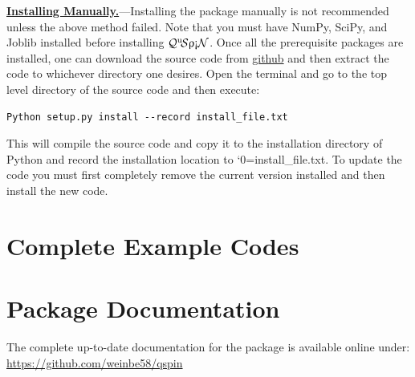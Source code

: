 \documentclass{SciPost}
\newcommand\0{\scalebox{-1}[1]{0}}
\let\svttfamily\ttfamily
\renewcommand\ttfamily{\svttfamily\catcode`0=\active }
\renewcommand\texttt{\bgroup\ttfamily\texttthelp}
\def\texttthelp#1{#1\egroup}
\newcommand{\qspin}{$\mathcal{Q}^{\mathrm{u}}\!\mathcal{S}\uprho\mathrm{\text{\textexclamdown}}\mathcal{N}$}
\begin{document}
\begin{appendix}
\underline{\bf Installing Manually.}---Installing the package manually is not recommended unless the above method failed. Note that you must have NumPy, SciPy, and Joblib installed before installing \qspin. Once all the prerequisite packages are installed, one can download the source code from \href{https://github.com/weinbe58/qspin/tree/master}{github} and then extract the code to whichever directory one desires. Open the terminal and go to the top level directory of the source code and then execute:  
\begin{lstlisting}[numbers=none]
Python setup.py install --record install_file.txt
\end{lstlisting}
This will compile the source code and copy it to the installation directory of Python and record the installation location to \texttt{install\_file.txt}. To update the code you must first completely remove the current version installed and then install the new code. 


\newpage
\section{Complete Example Codes}
\label{app:scripts}

\newpage

\newpage



\section{Package Documentation}
\label{app:doc}
The complete up-to-date documentation for the package is available online under:\\

\href{https://github.com/weinbe58/qspin}{https://github.com/weinbe58/qspin}\\

\end{appendix}


%
%

\nolinenumbers
\end{document}
